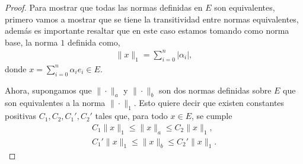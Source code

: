 \begin{enumerate}
\begin{proof}





Para mostrar que todas las normas definidas en $E$ son equivalentes, primero vamos a mostrar que se tiene la transitividad entre normas equivalentes, además es importante resaltar que en este caso estamos tomando como norma base, la norma $1$ definida como,
\begin{align*}
    \|x\|_1 = \sum_{i=0}^{n} |\alpha_i|,
\end{align*}
donde $x = \sum_{i=0}^{n} \alpha_i e_i \in E$.

Ahora, supongamos que $\|\cdot\|_a$ y $\|\cdot\|_b$ son dos normas definidas sobre $E$ que son equivalentes a la norma $\|\cdot\|_1$. Esto quiere decir que existen constantes positivas $C_1, C_2, C_1', C_2'$ tales que, para todo $x \in E$, se cumple
\begin{align*}
    C_1 \|x\|_1 \leq \|x\|_a \leq C_2 \|x\|_1, \\
    C_1' \|x\|_1 \leq \|x\|_b \leq C_2' \|x\|_1.
\end{align*}


\end{proof}
\end{enumerate}

